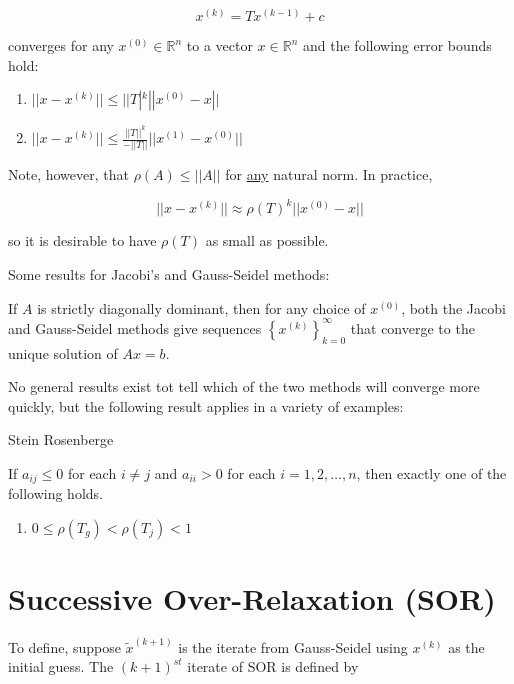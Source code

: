 \begin{equation*}
  x^{(k)} = Tx^{(k-1)} + c
\end{equation*}

converges for any $x^{(0)} \in \mathbb{R}^n$ to a vector $x \in \mathbb{R}^n$
and the following error bounds hold:

\begin{enumerate}[label=(\roman*)]
  \item $||x-x^{(k)}||\leq ||T|^k ||x^{(0)}-x||$
  \item $||x-x^{(k)}|| \leq \frac{||T||^k}{-||T||}||x^{(1)}-x^{(0)}||$
\end{enumerate}

Note, however, that $\rho(A) \leq ||A||$ for \uline{any} natural norm. In practice,

\begin{equation*}
  ||x-x^{(k)}|| \approx \rho(T)^k ||x^{(0)}-x||
\end{equation*}

so it is desirable to have $\rho(T)$ as small as possible.

Some results for Jacobi's and Gauss-Seidel methods:

\thm If $A$ is strictly diagonally dominant, then for any choice of $x^{(0)}$,
both the Jacobi and Gauss-Seidel methods give sequences $\left\{ x^{(k)} \right\}_{k=0}^\infty$
that converge to the unique solution of $Ax=b$.

No general results exist tot tell which of the two methods will converge more 
quickly, but the following result applies in a variety of examples:

\thm Stein Rosenberge

If $a_{ij} \leq 0$ for each $i\ne j$ and $a_{ii} >0$ for each $i=1,2,\dots,n$, 
then exactly one of the following holds.

\begin{enumerate}[label=(\alph*)]
  \item $0 \leq \rho(T_g) < \rho(T_j) < 1$
\end{enumerate}

\section{Successive Over-Relaxation (SOR)}

To define, suppose $\tilde{x}^{(k+1)}$ is the iterate from Gauss-Seidel using 
$x^{(k)}$ as the initial guess. The $(k+1)^{st}$ iterate of SOR is defined by

